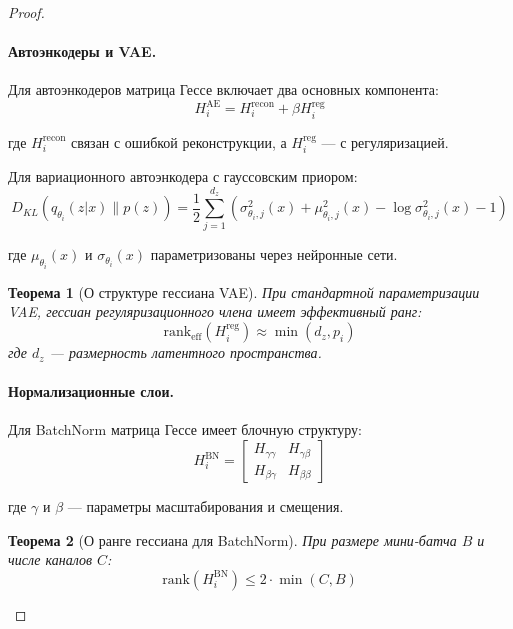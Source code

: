 \documentclass[a4paper,12pt]{article}
\newtheorem{theorem}{Теорема}
\begin{document}
\begin{proof}
    \paragraph{Автоэнкодеры и VAE.}
    Для автоэнкодеров матрица Гессе включает два основных компонента:
    \begin{equation}
    H_i^{\text{AE}} = H_i^{\text{recon}} + \beta H_i^{\text{reg}}
    \end{equation}
    
    где $H_i^{\text{recon}}$ связан с ошибкой реконструкции, а $H_i^{\text{reg}}$ — с регуляризацией.
    
    Для вариационного автоэнкодера с гауссовским приором:
    \begin{equation}
    D_{KL}(q_{\theta_i}(z|x) \| p(z)) = \frac{1}{2} \sum_{j=1}^{d_z} (\sigma_{\theta_i,j}^2(x) + \mu_{\theta_i,j}^2(x) - \log \sigma_{\theta_i,j}^2(x) - 1)
    \end{equation}
    
    где $\mu_{\theta_i}(x)$ и $\sigma_{\theta_i}(x)$ параметризованы через нейронные сети.
    
    \begin{theorem}[О структуре гессиана VAE]
    При стандартной параметризации VAE, гессиан регуляризационного члена имеет эффективный ранг:
    \begin{equation}
    \text{rank}_{\text{eff}}(H_i^{\text{reg}}) \approx \min(d_z, p_i)
    \end{equation}
    где $d_z$ — размерность латентного пространства.
    \end{theorem}
    
    \paragraph{Нормализационные слои.}
    Для BatchNorm матрица Гессе имеет блочную структуру:
    \begin{equation}
    H_i^{\text{BN}} = 
    \begin{bmatrix}
    H_{\gamma\gamma} & H_{\gamma\beta} \\
    H_{\beta\gamma} & H_{\beta\beta}
    \end{bmatrix}
    \end{equation}
    
    где $\gamma$ и $\beta$ — параметры масштабирования и смещения.
    
    \begin{theorem}[О ранге гессиана для BatchNorm]
    При размере мини-батча $B$ и числе каналов $C$:
    \begin{equation}
    \text{rank}(H_i^{\text{BN}}) \leq 2 \cdot \min(C, B)
    \end{equation}
    \end{theorem}
    

\end{proof}
\end{document}
